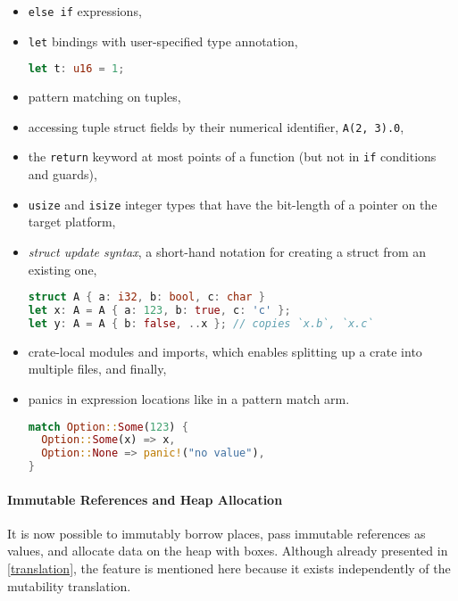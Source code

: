 \begin{itemize}
\item
  \passthrough{\lstinline!else if!} expressions,
\item
  \passthrough{\lstinline!let!} bindings with user-specified type
  annotation,
\begin{lstlisting}[language=Rust, style=short]
let t: u16 = 1;
\end{lstlisting}

\item
  pattern matching on tuples,
\item
  accessing tuple struct fields by their numerical identifier,
  \passthrough{\lstinline!A(2, 3).0!},
\item
  the \passthrough{\lstinline!return!} keyword at most points
  of a function (but not in \lstinline!if! conditions and guards),

\item \passthrough{\lstinline!usize!} and \passthrough{\lstinline!isize!}
integer types that have the bit-length of a pointer on the target platform,

\item
  \emph{struct update syntax}, a short-hand notation for creating a
  struct from an existing one,
\begin{lstlisting}[language=Rust, style=short]
struct A { a: i32, b: bool, c: char }
let x: A = A { a: 123, b: true, c: 'c' };
let y: A = A { b: false, ..x }; // copies `x.b`, `x.c`
\end{lstlisting}

\item crate-local modules and imports, which enables splitting up a crate into
multiple files, and finally,

\item
  panics in expression locations like in a pattern match arm.
\begin{lstlisting}[language=Rust, style=short]
match Option::Some(123) {
  Option::Some(x) => x,
  Option::None => panic!("no value"),
}
\end{lstlisting}

\end{itemize}

\paragraph{Immutable References and Heap Allocation}

It is now possible to immutably borrow places, pass immutable references as
values, and allocate data on the heap with boxes. Although already presented in
\autoref{translation}, the feature is mentioned here because it exists
independently of the mutability translation.

